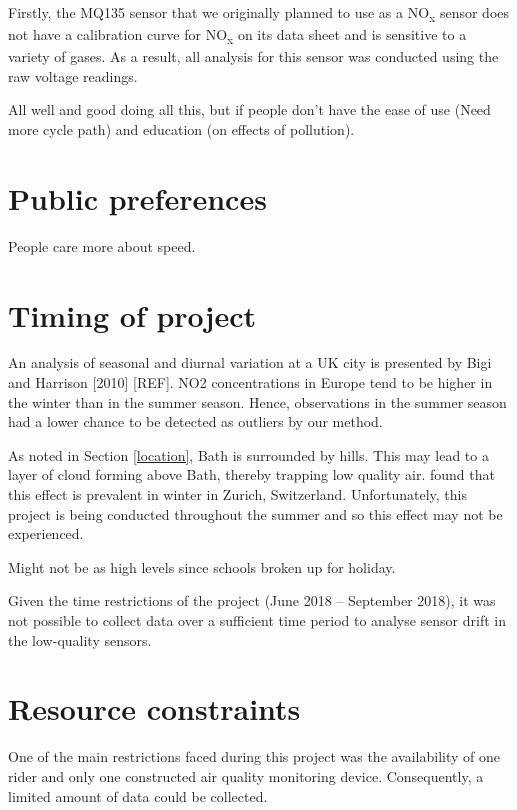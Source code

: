 \documentclass[11pt,twosided,a4paper]{report}
\begin{document}
Firstly, the MQ135 sensor that we originally planned to use as a NO\textsubscript{x} sensor does not have a calibration curve for NO\textsubscript{x} on its data sheet and is sensitive to a variety of gases. As a result, all analysis for this sensor was conducted using the raw voltage readings.


All well and good doing all this, but if people don't have the ease of use (Need more cycle path) and education (on effects of pollution).

\section{Public preferences}

People care more about speed.

\section{Timing of project}

An analysis of seasonal and diurnal variation at a UK city is presented by Bigi and Harrison [2010] [REF]. NO2 concentrations in Europe tend to be higher in the winter than in the summer season. Hence, observations in the summer season had a lower chance to be detected as outliers by our method.

As noted in Section \ref{location}, Bath is surrounded by hills. This may lead to a layer of cloud forming above Bath, thereby trapping low quality air. \cite{Hasenfratz2015highresmapsTram} found that this effect is prevalent in winter in Zurich, Switzerland. Unfortunately, this project is being conducted throughout the summer and so this effect may not be experienced. 

Might not be as high levels since schools broken up for holiday.

Given the time restrictions of the project (June 2018 -- September 2018), it was not possible to collect data over a sufficient time period to analyse sensor drift in the low-quality sensors.

\section{Resource constraints}

One of the main restrictions faced during this project was the availability of one rider and only one constructed air quality monitoring device. Consequently, a limited amount of data could be collected.
\end{document}
